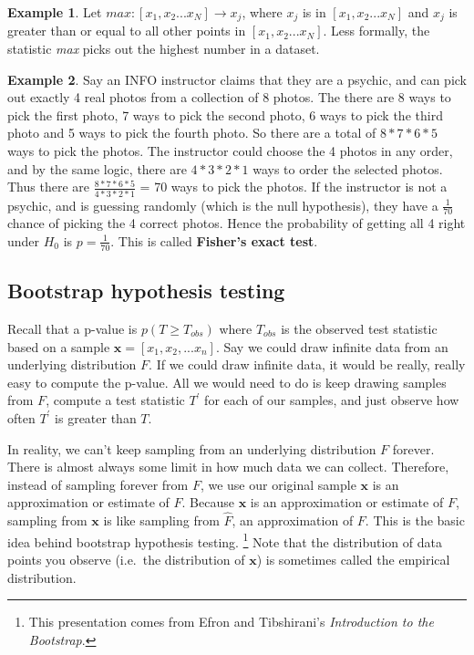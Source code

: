\documentclass[]{article}
\theoremstyle{definition}
\newtheorem{exmp}{Example}[section]
\begin{document}
\begin{exmp}
Let $max: [x_1, x_2 ... x_N] \rightarrow x_j$, where $x_j$ is in  $[x_1, x_2 ... x_N] $ and $x_j$ is greater than or equal to all other points in $ [x_1, x_2 ... x_N]$. Less formally, the statistic \textit{max} picks out the highest number in a dataset.
\end{exmp}

\begin{exmp}
Say an INFO instructor claims that they are a psychic, and can pick out exactly 4 real photos from a collection of 8 photos. The there are 8 ways to pick the first photo, 7 ways to pick the second photo, 6 ways to pick the third photo and 5 ways to pick the fourth photo. So there are a total of $8*7*6*5$ ways to pick the photos. The instructor could choose the 4 photos in any order, and by the same logic, there are $4*3*2*1$ ways to order the selected photos. Thus there are $\frac{8 * 7 * 6 * 5}{4 * 3 * 2 *1}$ = 70 ways to pick the photos. If the instructor is not a psychic, and is guessing randomly (which is the null hypothesis), they have a $\frac{1}{70}$ chance of picking the 4 correct photos. Hence the probability of getting all 4 right under $H_0$ is $p=\frac{1}{70}$. This is called \textbf{Fisher's exact test}.
\end{exmp}


\subsection{Bootstrap hypothesis testing}
Recall that a p-value is $p(T \geq T_{obs})$ where $T_{obs}$ is the observed test statistic based on a sample $\bm{x} = [x_1, x_2, ... x_n]$. Say we could draw infinite data from an underlying distribution $F$. If we could draw infinite data, it would be really, really easy to compute the p-value. All we would need to do is keep drawing samples from $F$, compute a test statistic $T^{\prime}$ for each of our samples, and just observe how often $T^{\prime}$ is greater than $T$. 

In reality, we can't keep sampling from an underlying distribution $F$ forever.  There is almost always some limit in how much data we can collect. Therefore, instead of sampling forever from $F$, we use our original sample $\bm{x}$ is an approximation or estimate of $F$. Because $\bm{x}$ is an approximation or estimate of $F$, sampling from $\bm{x}$ is like sampling from $\hat{F}$, an approximation of $F$. This is the basic idea behind bootstrap hypothesis testing.
\footnote{This presentation comes from Efron and Tibshirani's \textit{Introduction to the Bootstrap}.}  Note that the distribution of data points you observe (i.e.\ the distribution of $\bm{x}$) is sometimes called the empirical distribution.
\end{document}

